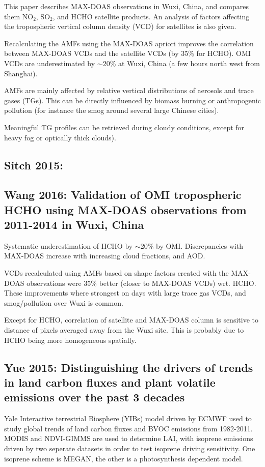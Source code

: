 \documentclass[11pt]{article} %
\begin{document}
    This paper describes MAX-DOAS observations in Wuxi, China, and compares them NO$_2$, SO$_2$, and HCHO satellite products.
    An analysis of factors affecting the tropospheric vertical column density (VCD) for satellites is also given.
    
    Recalculating the AMFs using the MAX-DOAS apriori improves the correlation between MAX-DOAS VCDs and the satellite VCDs (by 35\% for HCHO). 
    OMI VCDs are underestimated by $\sim20$\% at Wuxi, China (a few hours north west from Shanghai).
    
    AMFs are mainly affected by relative vertical distributions of aerosols and trace gases (TGs).
    This can be directly influenced by biomass burning or anthropogenic pollution (for instance the smog around several large Chinese cities).
    
    Meaningful TG profiles can be retrieved during cloudy conditions, except for heavy fog or optically thick clouds).
    
  \subsection{Sitch 2015: }
  
  \subsection{Wang 2016: Validation of OMI tropospheric HCHO using MAX-DOAS observations from 2011-2014 in Wuxi, China}
    \citet{Wang2016}
    Systematic underestimation of HCHO by $\sim$20\% by OMI.
    Discrepancies with MAX-DOAS increase with increasing cloud fractions, and AOD.
    
    VCDs recalculated using AMFs based on shape factors created with the MAX-DOAS observations were 35\% better (closer to MAX-DOAS VCDs) wrt. HCHO.
    These improvements where strongest on days with large trace gas VCDs, and smog/pollution over Wuxi is common.
    
    Except for HCHO, correlation of satellite and MAX-DOAS column is sensitive to distance of pixels averaged away from the Wuxi site.
    This is probably due to HCHO being more homogeneous spatially.
    
  \subsection{Yue 2015: Distinguishing the drivers of trends in land carbon fluxes and plant
volatile emissions over the past 3 decades}
    \citet{Yue2015}
    Yale Interactive terrestrial Biosphere (YIBs) model driven by ECMWF used to study global trends of land carbon fluxes and BVOC emissions from 1982-2011.
    MODIS and NDVI-GIMMS are used to determine LAI, with isoprene emissions driven by two seperate datasets in order to test isoprene driving sensitivity.
    One isoprene scheme is MEGAN, the other is a photosynthesis dependent model.
    
\end{document}

